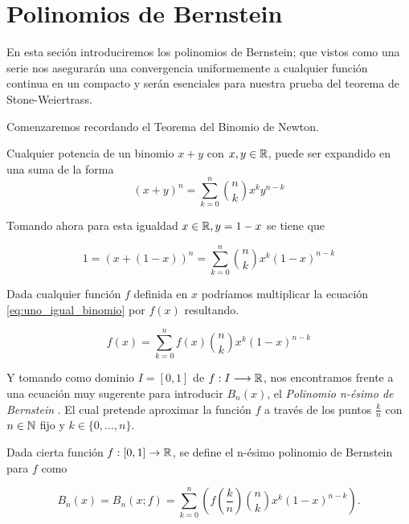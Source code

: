 %

\section{Polinomios de Bernstein}\label{ch:Bernstein}  

En esta seción introduciremos los polinomios de Bernstein;   que vistos como una serie nos asegurarán una convergencia uniformemente a cualquier función continua en un compacto y serán esenciales para nuestra prueba del teorema de Stone-Weiertrass.  

Comenzaremos recordando el Teorema del Binomio de Newton. 


\begin{teorema}
    Cualquier potencia de un binomio $x+y$ con $x,y \in \mathbb{R}$,  puede ser expandido en una suma de la forma
    \[(x+y)^n = \sum_{k=0}^n \binom{n}{k} x^{k}y^{n-k}\]
\end{teorema}  

Tomando ahora para esta igualdad $x \in \mathbb{R}, y= 1-x$ se tiene que 

\begin{equation}\label{eq:uno_igual_binomio}
    1 = (x+ (1-x))^n = \sum_{k=0}^n \binom{n}{k} x^{k} (1-x)^{n-k}
\end{equation}

Dada cualquier función $f$ definida en $x$ podríamos multiplicar la ecuación 
\eqref{eq:uno_igual_binomio} por $f(x)$ resultando. 

\begin{equation}\label{eq:f_igual_binomio}
    f(x) = \sum_{k=0}^n f(x) \binom{n}{k} x^{k} (1-x)^{n-k}
\end{equation} 

Y tomando como dominio $I=[0,1]$ de $f: I \longrightarrow \mathbb{R}$,
 nos encontramos
frente a una ecuación muy sugerente para introducir $B_n(x)$, el \textit{Polinomio n-ésimo  de Bernstein }. 
El cual pretende  aproximar la función $f$ a través de los puntos $\frac{k}{n}$ con $n \in \mathbb{N}$ fijo
y $k \in \{0,...,n \}.$

\begin{definicion} \label{def:Bernstein}
    Dada cierta función $f: [0,1] \rightarrow \mathbb{R}$, se define el n-ésimo polinomio de Bernstein para $f$ como 

    $$B_n(x) = B_n(x;f)=\sum_ {k=0}^{n} \left( f \left( \frac{k}{n} \right) \binom{n}{k} x^k (1-x)^{n-k} \right) .$$

\end{definicion}

